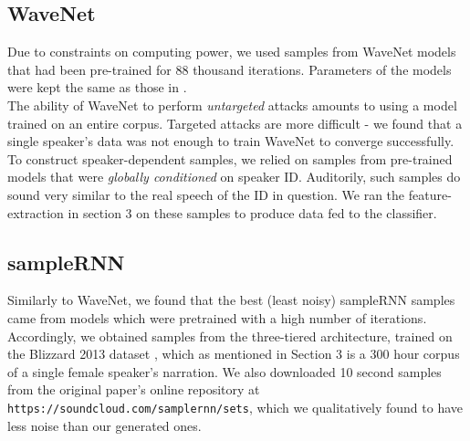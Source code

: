 \subsection{WaveNet}
Due to constraints on computing power, we used samples from WaveNet models that had been pre-trained for 88 thousand iterations. Parameters of the models were kept the same as those in \cite{van2016wavenet}. \\
The ability of WaveNet to perform \textit{untargeted} attacks amounts to using a model trained on an entire corpus. Targeted attacks are more difficult - we found that a single speaker's data was not enough to train WaveNet to converge successfully. To construct speaker-dependent samples, we relied on samples from pre-trained models that were \textit{globally conditioned} on speaker ID. Auditorily, such samples do sound very similar to the real speech of the ID in question. We ran the feature-extraction in section 3 on these samples to produce data fed to the classifier.
 
\subsection{sampleRNN} %
Similarly to WaveNet, we found that the best (least noisy) sampleRNN samples came from models which were pretrained with a high number of iterations. Accordingly, we obtained samples from the three-tiered architecture, trained on the
Blizzard 2013 dataset \cite{prahallad2013blizzard}, which as mentioned in Section 3 is a 300 hour corpus of a single female speaker's narration. We also downloaded 10 second samples from the original paper's online repository at
\texttt{https://soundcloud.com/samplernn/sets}, which we qualitatively found to have less noise than our generated ones. 

